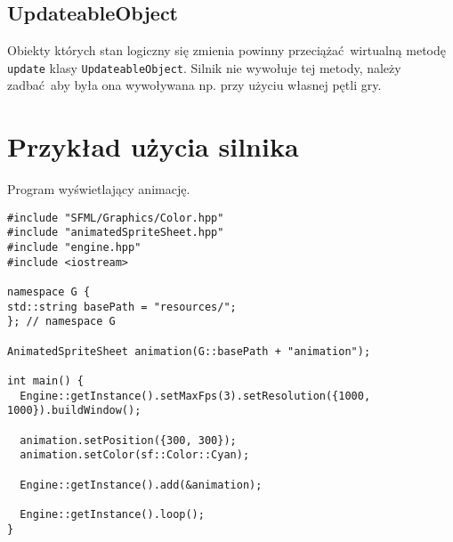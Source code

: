 \documentclass[11pt]{article}
\begin{document}
\subsection{UpdateableObject}
\label{sec:org5aac746}
Obiekty których stan logiczny się zmienia powinny przeciążać wirtualną metodę \texttt{update} klasy \texttt{UpdateableObject}.
Silnik nie wywołuje tej metody, należy zadbać aby była ona wywoływana np. przy użyciu własnej pętli gry.
\section{Przykład użycia silnika}
\label{sec:org1168046}
Program wyświetlający animację.

\begin{verbatim}
#include "SFML/Graphics/Color.hpp"
#include "animatedSpriteSheet.hpp"
#include "engine.hpp"
#include <iostream>

namespace G {
std::string basePath = "resources/";
}; // namespace G

AnimatedSpriteSheet animation(G::basePath + "animation");

int main() {
  Engine::getInstance().setMaxFps(3).setResolution({1000, 1000}).buildWindow();

  animation.setPosition({300, 300});
  animation.setColor(sf::Color::Cyan);

  Engine::getInstance().add(&animation);

  Engine::getInstance().loop();
}
\end{verbatim}
\end{document}
